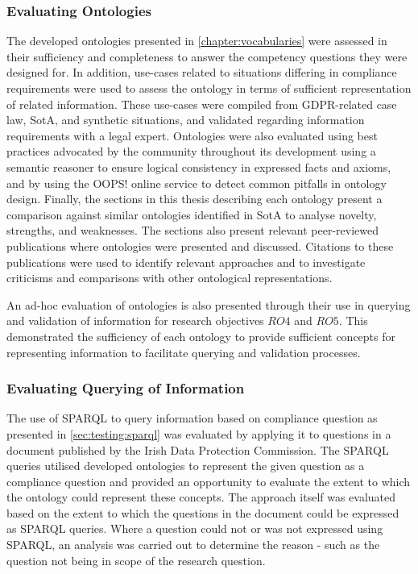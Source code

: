 \subsubsection{Evaluating Ontologies}
The developed ontologies presented in \autoref{chapter:vocabularies} were assessed in their sufficiency and completeness to answer the competency questions they were designed for. 
In addition, use-cases related to situations differing in compliance requirements were used to assess the ontology in terms of sufficient representation of related information. These use-cases were compiled from GDPR-related case law, SotA, and synthetic situations, and validated regarding information requirements with a legal expert.
Ontologies were also evaluated using best practices advocated by the community throughout its development using a semantic reasoner to ensure logical consistency in expressed facts and axioms, and by using the OOPS! \cite{poveda-villalon_oops!_2014} online service to detect common pitfalls in ontology design.
Finally, the sections in this thesis describing each ontology present a comparison against similar ontologies identified in SotA to analyse novelty, strengths, and weaknesses.
The sections also present relevant peer-reviewed publications where ontologies were presented and discussed. Citations to these publications were used to identify relevant approaches and to investigate criticisms and comparisons with other ontological representations.

An ad-hoc evaluation of ontologies is also presented through their use in querying and validation of information for research objectives $RO4$ and $RO5$. This demonstrated the sufficiency of each ontology to provide sufficient concepts for representing information to facilitate querying and validation processes.

\subsubsection{Evaluating Querying of Information}
The use of SPARQL to query information based on compliance question as presented in \autoref{sec:testing:sparql} was evaluated by applying it to questions in a document published by the Irish Data Protection Commission.
The SPARQL queries utilised developed ontologies to represent the given question as a compliance question and provided an opportunity to evaluate the extent to which the ontology could represent these concepts.
The approach itself was evaluated based on the extent to which the questions in the document could be expressed as SPARQL queries.
Where a question could not or was not expressed using SPARQL, an analysis was carried out to determine the reason - such as the question not being in scope of the research question.

